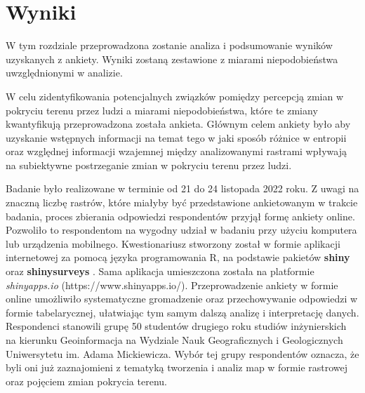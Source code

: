 \documentclass{amuthesis}
\begin{document}

\hypertarget{sec-wyniki}{%
\chapter{Wyniki}\label{sec-wyniki}}

W tym rozdziale przeprowadzona zostanie analiza i podsumowanie wyników
uzyskanych z ankiety. Wyniki zostaną zestawione z miarami
niepodobieństwa uwzględnionymi w analizie.

W celu zidentyfikowania potencjalnych związków pomiędzy percepcją zmian
w pokryciu terenu przez ludzi a miarami niepodobieństwa, które te zmiany
kwantyfikują przeprowadzona została ankieta. Głównym celem ankiety było
aby uzyskanie wstępnych informacji na temat tego w jaki sposób różnice w
entropii oraz względnej informacji wzajemnej między analizowanymi
rastrami wpływają na subiektywne postrzeganie zmian w pokryciu terenu
przez ludzi.

Badanie było realizowane w terminie od 21 do 24 listopada 2022 roku. Z
uwagi na znaczną liczbę rastrów, które miałyby być przedstawione
ankietowanym w trakcie badania, proces zbierania odpowiedzi respondentów
przyjął formę ankiety online. Pozwoliło to respondentom na wygodny
udział w badaniu przy użyciu komputera lub urządzenia mobilnego.
Kwestionariusz stworzony został w formie aplikacji internetowej za
pomocą języka programowania R, na podstawie pakietów \textbf{shiny}
\autocite*{R-shiny} oraz \textbf{shinysurveys}
\autocite*{R-shinysurveys}. Sama aplikacja umieszczona została na
platformie \emph{shinyapps.io} (https://www.shinyapps.io/).
Przeprowadzenie ankiety w formie online umożliwiło systematyczne
gromadzenie oraz przechowywanie odpowiedzi w formie tabelarycznej,
ułatwiając tym samym dalszą analizę i interpretację danych. Respondenci
stanowili grupę 50 studentów drugiego roku studiów inżynierskich na
kierunku Geoinformacja na Wydziale Nauk Geograficznych i Geologicznych
Uniwersytetu im. Adama Mickiewicza. Wybór tej grupy respondentów
oznacza, że byli oni już zaznajomieni z tematyką tworzenia i analiz map
w formie rastrowej oraz pojęciem zmian pokrycia terenu.
\end{document}

